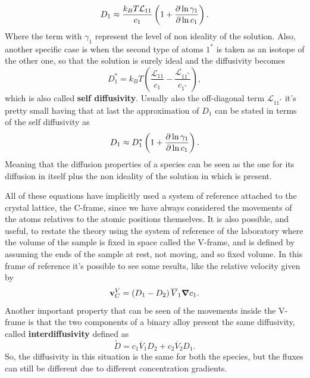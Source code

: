 \begin{equation}
    D_1 \approx \frac{k_BT\mathcal{L}_{11}}{c_1}\left( 1 + \pdv{\ln\gamma_1}{\ln c_1} \right).
\end{equation}
Where the term with $\gamma_1$ represent the level of non ideality of the solution. Also, another specific case is when the second type of atoms $1^*$ is taken as an isotope of the other one, so that the solution is surely ideal and the diffusivity becomes
\begin{equation}
    D_{1}^* = k_BT\left( \frac{\mathcal{L}_{11}}{c_1} - \frac{\mathcal{L}_{11^*}}{c_{1^*}} \right),
\end{equation}
which is also called \textbf{self diffusivity}. Usually also the off-diagonal term $\mathcal{L}_{11^*}$  it's pretty small having that at last the approximation of $D_1$ can be stated in terms of the self diffusivity as 
\begin{equation}
    D_1 \approx D_{1}^*\left( 1 + \pdv{\ln\gamma_1}{\ln c_1} \right).
\end{equation}
Meaning that the diffusion properties of a species can be seen as the one for its diffusion in itself plus the non ideality of the solution in which is present.

All of these equations have implicitly used a system of reference attached to the crystal lattice, the C-frame, since we have always considered the movements of the atoms relatives to the atomic positions themselves. It is also possible, and useful, to restate the theory using the system of reference of the laboratory where the volume of the sample is fixed in space called the V-frame, and is defined by assuming the ends of the sample at rest, not moving, and so fixed volume. In this frame of reference it's possible to see some results, like the relative velocity given by
\begin{equation}
    \vb{v}_C^V = \left( D_1 - D_2 \right)\overline{V}_1 \grad c_1.
\end{equation}
Another important property that can be seen of the movements inside the V-frame is that the two components of a binary alloy present the same diffusivity, called \textbf{interdiffusivity} defined as
\begin{equation}
    \tilde{D} = c_1\overline{V}_1 D_2 + c_2\overline{V}_2D_1.
\end{equation}
So, the diffusivity in this situation is the same for both the species, but the fluxes can still be different due to different concentration gradients.

